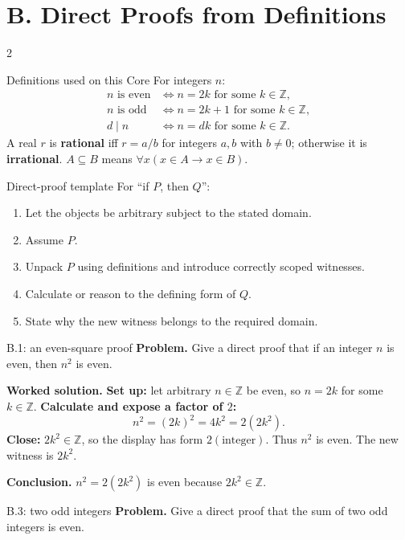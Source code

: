 \documentclass[10pt]{article}
\newcommand{\term}[1]{\textbf{\color{CoreNavy}#1}}
\begin{document}
\section*{B. Direct Proofs from Definitions}
\begin{multicols}{2}
\begin{definitionbox}{Definitions used on this Core}
For integers $n$:
\[
\begin{array}{ll}
n\text{ is even}&\Longleftrightarrow n=2k\text{ for some }k\in\mathbb Z,\\
n\text{ is odd}&\Longleftrightarrow n=2k+1\text{ for some }k\in\mathbb Z,\\
d\mid n&\Longleftrightarrow n=dk\text{ for some }k\in\mathbb Z.
\end{array}
\]
A real $r$ is \term{rational} iff $r=a/b$ for integers $a,b$ with $b\ne0$;
otherwise it is \term{irrational}. $A\subseteq B$ means
$\forall x(x\in A\to x\in B)$.
\end{definitionbox}

\begin{methodbox}{Direct-proof template}
For ``if $P$, then $Q$'':
\begin{enumerate}
\item Let the objects be arbitrary subject to the stated domain.
\item Assume $P$.
\item Unpack $P$ using definitions and introduce correctly scoped witnesses.
\item Calculate or reason to the defining form of $Q$.
\item State why the new witness belongs to the required domain.
\end{enumerate}
\end{methodbox}

\begin{workedbox}{B.1: an even-square proof}
\textbf{Problem.} Give a direct proof that if an integer $n$ is even, then $n^2$ is even.

\textbf{Worked solution.} \textbf{Set up:} let arbitrary $n\in\mathbb Z$ be even, so $n=2k$ for some
$k\in\mathbb Z$. \textbf{Calculate and expose a factor of $2$:}
\[
n^2=(2k)^2=4k^2=2(2k^2).
\]
\textbf{Close:} $2k^2\in\mathbb Z$, so the display has form
$2(\text{integer})$. Thus $n^2$ is even. The new witness is $2k^2$.

\textbf{Conclusion.} $n^2=2(2k^2)$ is even because $2k^2\in\mathbb Z$.
\end{workedbox}

\begin{workedbox}{B.3: two odd integers}
\textbf{Problem.} Give a direct proof that the sum of two odd integers is even.


\end{workedbox}
\end{multicols}
\end{document}
